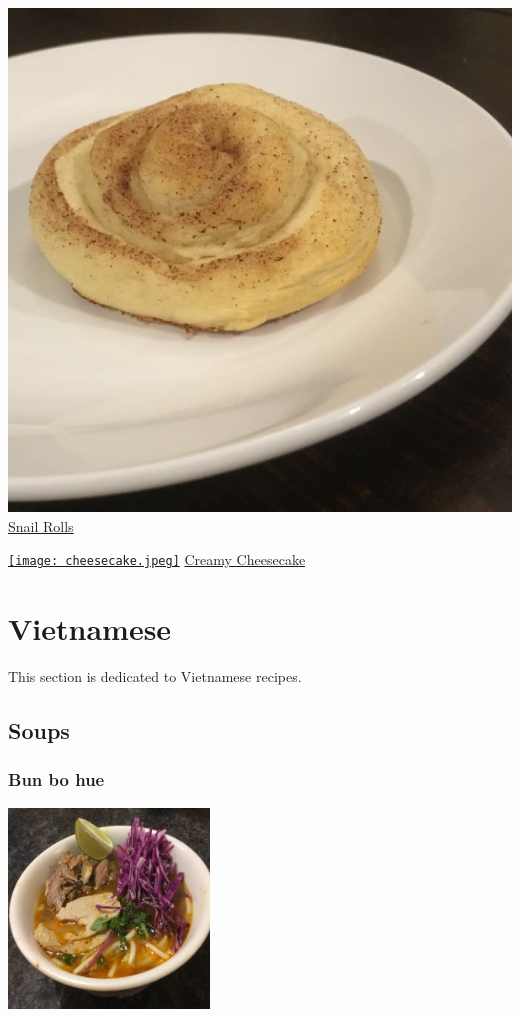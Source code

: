 \documentclass[
]{book}
\begin{document}
\protect\hyperlink{snailroll}{\includegraphics[width=1\textwidth,height=\textheight]{snail_roll_small.jpg}}
\protect\hyperlink{snailroll}{Snail Rolls}

\protect\hyperlink{cheesecake}{\texttt{[image: cheesecake.jpeg]}}
\protect\hyperlink{cheesecake}{Creamy Cheesecake}

\hypertarget{viet}{%
\chapter*{Vietnamese}\label{viet}}

This section is dedicated to Vietnamese recipes.

\hypertarget{soups}{%
\section*{Soups}\label{soups}}

\hypertarget{bohue}{%
\subsection*{Bun bo hue}\label{bohue}}

\includegraphics[width=0.4\textwidth,height=\textheight]{bun_bo_hue_small.jpg}
\end{document}
